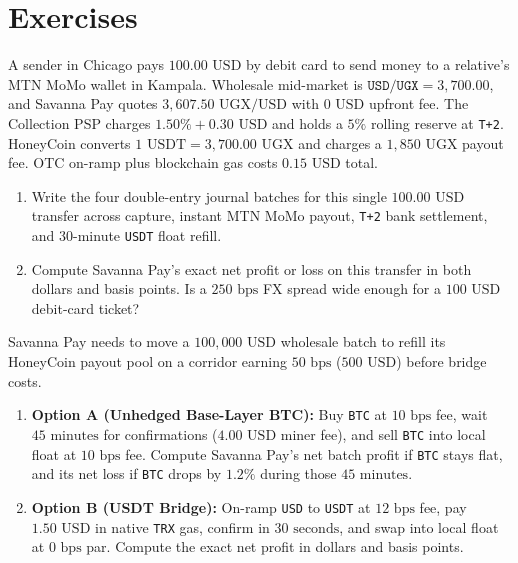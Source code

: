 \section*{Exercises}

\begin{exercise}
A sender in Chicago pays $100.00\text{ USD}$ by debit card to send money to a relative's MTN MoMo wallet in Kampala. Wholesale mid-market is $\texttt{USD/UGX} = 3{,}700.00$, and Savanna Pay quotes $3{,}607.50\text{ UGX/USD}$ with $0\text{ USD}$ upfront fee. The Collection PSP charges $1.50\% + 0.30\text{ USD}$ and holds a $5\%$ rolling reserve at \texttt{T+2}. HoneyCoin converts $1\text{ USDT} = 3{,}700.00\text{ UGX}$ and charges a $1{,}850\text{ UGX}$ payout fee. OTC on-ramp plus blockchain gas costs $0.15\text{ USD}$ total.
\begin{enumerate}
  \item Write the four double-entry journal batches for this single $100.00\text{ USD}$ transfer across capture, instant MTN MoMo payout, \texttt{T+2} bank settlement, and 30-minute \texttt{USDT} float refill.
  \item Compute Savanna Pay's exact net profit or loss on this transfer in both dollars and basis points. Is a $250\text{ bps}$ FX spread wide enough for a $100\text{ USD}$ debit-card ticket?
\end{enumerate}
\end{exercise}

\begin{exercise}
Savanna Pay needs to move a $100{,}000\text{ USD}$ wholesale batch to refill its HoneyCoin payout pool on a corridor earning $50\text{ bps}$ ($500\text{ USD}$) before bridge costs.
\begin{enumerate}
  \item \textbf{Option A (Unhedged Base-Layer BTC):} Buy \texttt{BTC} at $10\text{ bps}$ fee, wait $45\text{ minutes}$ for confirmations ($4.00\text{ USD}$ miner fee), and sell \texttt{BTC} into local float at $10\text{ bps}$ fee. Compute Savanna Pay's net batch profit if \texttt{BTC} stays flat, and its net loss if \texttt{BTC} drops by $1.2\%$ during those $45\text{ minutes}$.
  \item \textbf{Option B (USDT Bridge):} On-ramp \texttt{USD} to \texttt{USDT} at $12\text{ bps}$ fee, pay $1.50\text{ USD}$ in native \texttt{TRX} gas, confirm in $30\text{ seconds}$, and swap into local float at $0\text{ bps}$ par. Compute the exact net profit in dollars and basis points.
\end{enumerate}
\end{exercise}

